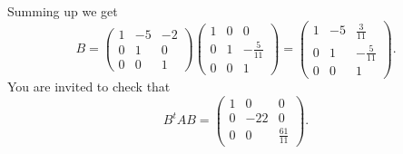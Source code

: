 \documentclass{article}
\begin{document}
\begin{example}
Summing up we get
  \begin{equation*}
    B = 
    \begin{pmatrix}
      1 & -5 & -2\\
      0 & 1 & 0\\
      0 & 0 & 1
    \end{pmatrix}
    \begin{pmatrix}
      1 & 0 & 0\\
      0 & 1 & -\frac{5}{11}\\
      0 & 0 & 1
    \end{pmatrix}
    =
    \begin{pmatrix}
      1 & -5 & \frac{3}{11}\\
      0 & 1 & -\frac{5}{11}\\
      0 & 0 & 1
    \end{pmatrix}
    .
  \end{equation*}
  You are invited to check that
  \begin{equation*}
    B^t A B =
    \begin{pmatrix}
      1 & 0 & 0\\
      0 & -22 & 0\\
      0 & 0 & \frac{61}{11}
    \end{pmatrix}
    .
  \end{equation*}
\end{example}
\end{document}
